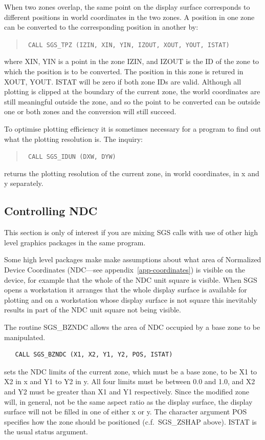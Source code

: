 \documentclass[11pt]{article}
\newcommand{\hyperref}[4]{#2\ref{#4}#3}
\newcommand{\htmlref}[2]{#1}
\begin{document}
When two zones overlap, the same point on the display surface corresponds to
different positions in world coordinates in the two zones. A position in one
zone can be converted to the corresponding position in another by:
\begin{quote}{\tt
    CALL \htmlref{SGS\_TPZ}{SGS_TPZ} (IZIN, XIN, YIN, IZOUT, XOUT, YOUT, ISTAT)}
\end{quote}
where XIN, YIN is a point in the zone IZIN, and IZOUT is the ID of the zone to
which the position is to be converted.  The position in this zone is retured
in XOUT, YOUT. ISTAT will be zero if both zone IDs are valid.  Although all
plotting is clipped at the boundary of the current zone, the world coordinates
are still meaningful outside the zone, and so the point to be converted can 
be outside one or both zones and the conversion will still succeed.

To optimise plotting efficiency it is sometimes
necessary for a program to find out what the
plotting resolution is.  The inquiry:
\begin{quote}{\tt
    CALL \htmlref{SGS\_IDUN}{SGS_IDUN} (DXW, DYW)}
\end{quote}
returns the plotting resolution of the current zone, in
world coordinates, in x and y separately.

\subsection {Controlling NDC}

This section is only of interest if you are mixing SGS calls with use of other
high level graphics packages in the same program. 

Some high level packages make make assumptions about what area of Normalized
Device Coordinates (NDC---see 
\hyperref{this appendix}{appendix~}{}{app-coordinates}) is visible on the
device, for example that the whole of the NDC unit square is visible. When SGS
opens a workstation it arranges that the whole display surface is available for
plotting and on a workstation whose display surface is not square  this
inevitably results in part of the NDC unit square not being visible. 

The routine \htmlref{SGS\_BZNDC}{SGS_BZNDC} allows the area of NDC 
occupied by a base zone to be manipulated.
\begin{verbatim}
   CALL SGS_BZNDC (X1, X2, Y1, Y2, POS, ISTAT)
\end{verbatim}
sets the NDC limits of the current zone, which must be a base zone, to be X1 to
X2 in x and Y1 to Y2 in y. All four limits must be between 0.0 and 1.0, and X2
and Y2 must be greater than X1 and Y1 respectively. Since the modified zone
will, in general, not be the same aspect ratio as the display surface, the
display surface will not be filled in one of either x or y. The character
argument POS specifies how the zone should be positioned (c.f.\ 
\htmlref{SGS\_ZSHAP}{SGS_ZSHAP}
above). ISTAT is the usual status argument. 
\end{document}
